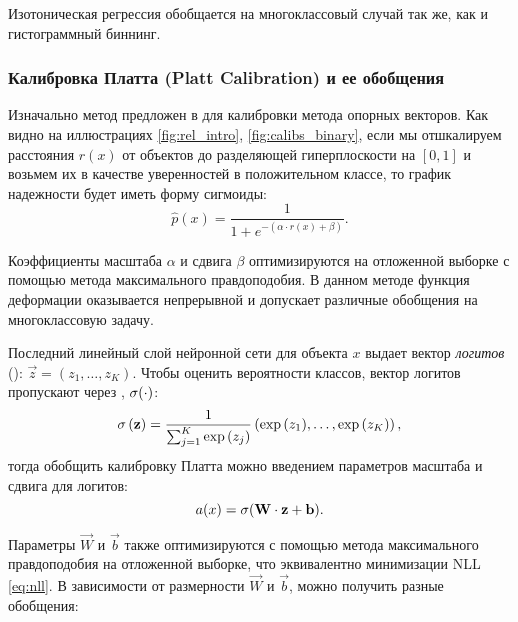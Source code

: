 \documentclass[12pt]{article}
\begin{document}
Изотоническая регрессия обобщается на многоклассовый случай так же, как и гистограммный биннинг.

\subsubsection{Калибровка Платта (Platt Calibration) и ее обобщения}
Изначально метод предложен в \cite{platt} для калибровки метода опорных векторов. Как видно на иллюстрациях \autoref{fig:rel_intro}, \autoref{fig:calibs_binary}, если мы отшкалируем расстояния $r(x)$ от объектов до разделяющей гиперплоскости на $[0, 1]$ и возьмем их в качестве уверенностей в положительном классе, то график надежности будет иметь форму сигмоиды:
\begin{equation}
    \hat{p}(x) = \frac{1}{1+e^{-(\alpha \cdot r(x) + \beta)}}.
\end{equation}

Коэффициенты масштаба $\alpha$ и сдвига $\beta$ оптимизируются на отложенной выборке с помощью метода максимального правдоподобия. В данном методе функция деформации оказывается непрерывной и допускает различные обобщения на многоклассовую задачу.

Последний линейный слой нейронной сети для объекта $x$ выдает вектор \emph{логитов} (): $\vec{z} = (z_1,\dots,z_K)$. Чтобы оценить вероятности классов, вектор логитов пропускают через , $\operatorname{\sigma}(\cdot)$:
\begin{equation*}
    \operatorname{\sigma}\left(\mathbf{z}\right)=
    \frac{1}{\sum_{j=1}^{K} {\exp{\left(z_j\right)}}}
    \left(
        {\exp{\left(z_1\right)}},
        \dots,
        {\exp{\left(z_K\right)}}
    \right),
\end{equation*}
тогда обобщить калибровку Платта можно введением параметров масштаба и сдвига для логитов:
\begin{equation}
    a(x) = \operatorname{\sigma}(\mathbf{W}\cdot \mathbf{z} + \mathbf{b}).
\end{equation}

Параметры $\vec{W}$ и $\vec{b}$ также оптимизируются с помощью метода максимального правдоподобия на отложенной выборке, что эквивалентно минимизации NLL \eqref{eq:nll}. В зависимости от размерности $\vec{W}$ и $\vec{b}$, можно получить разные обобщения:
\end{document}
